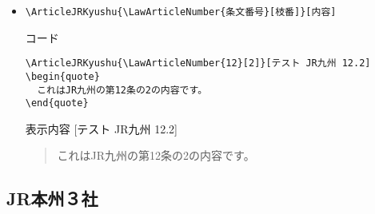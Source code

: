\documentclass[oneside,10pt,a4paper]{jsarticle}
\begin{document}
\begin{itemize}
\begin{itembox}[l]{表示内容}
        \begin{quote}
          これはJR九州の第12条の内容です。
        \end{quote}
      \end{itembox}
    \item \verb|\ArticleJRKyushu{\LawArticleNumber{条文番号}[枝番]}[内容]|
      \begin{itembox}[l]{コード}
        {\footnotesize\begin{verbatim}
\ArticleJRKyushu{\LawArticleNumber{12}[2]}[テスト JR九州 12.2]
\begin{quote}
  これはJR九州の第12条の2の内容です。
\end{quote}\end{verbatim}}
      \end{itembox}
      \begin{itembox}[l]{表示内容}
        [テスト JR九州 12.2]
        \begin{quote}
          これはJR九州の第12条の2の内容です。
        \end{quote}
      \end{itembox}
  \end{itemize}

  \newpage

  \subsection{JR本州３社}
\end{document}
